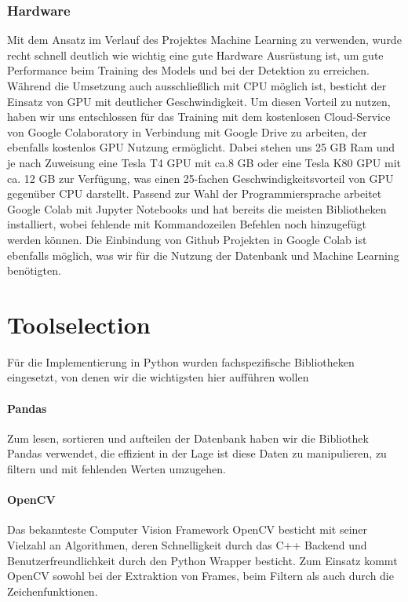 \subsubsection*{Hardware}
Mit dem Ansatz im Verlauf des Projektes Machine Learning zu verwenden, wurde recht schnell deutlich wie wichtig eine gute Hardware Ausrüstung ist, um gute Performance beim Training des Models und bei der Detektion zu erreichen. Während die Umsetzung auch ausschließlich mit CPU möglich ist, besticht der Einsatz von GPU mit deutlicher Geschwindigkeit. Um diesen Vorteil zu nutzen, haben wir uns entschlossen für das Training mit dem kostenlosen Cloud-Service von Google Colaboratory in Verbindung mit Google Drive zu arbeiten, der ebenfalls kostenlos GPU Nutzung ermöglicht. Dabei stehen uns 25 GB Ram und je nach Zuweisung eine Tesla T4 GPU mit ca.8 GB oder eine Tesla K80 GPU mit ca. 12 GB zur Verfügung, was einen 25-fachen Geschwindigkeitsvorteil von GPU gegenüber CPU darstellt. Passend zur Wahl der Programmiersprache arbeitet Google Colab mit Jupyter Notebooks und hat bereits die meisten Bibliotheken installiert, wobei fehlende mit Kommandozeilen Befehlen noch hinzugefügt werden können. Die Einbindung von Github Projekten in Google Colab ist ebenfalls möglich, was wir für die Nutzung der Datenbank und Machine Learning benötigten.

\section{Toolselection}
Für die Implementierung in Python wurden fachspezifische Bibliotheken eingesetzt, von denen wir die wichtigsten hier aufführen wollen
\paragraph{Pandas}
Zum lesen, sortieren und aufteilen der Datenbank haben wir die Bibliothek Pandas verwendet, die effizient in der Lage ist diese Daten zu manipulieren, zu filtern und mit fehlenden Werten umzugehen.

\paragraph{OpenCV}
Das bekannteste Computer Vision Framework OpenCV besticht mit seiner Vielzahl an Algorithmen, deren Schnelligkeit durch das C++ Backend und Benutzerfreundlichkeit durch den Python Wrapper besticht. Zum Einsatz kommt OpenCV sowohl bei der Extraktion von Frames, beim Filtern als auch durch die Zeichenfunktionen.

